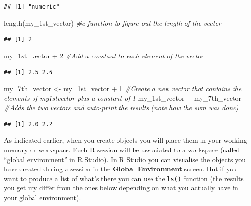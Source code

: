 \documentclass[
]{book}
\newenvironment{Shaded}{\begin{snugshade}}{\end{snugshade}}
\newcommand{\CommentTok}[1]{\textcolor[rgb]{0.56,0.35,0.01}{\textit{#1}}}
\newcommand{\DecValTok}[1]{\textcolor[rgb]{0.00,0.00,0.81}{#1}}
\newcommand{\FunctionTok}[1]{\textcolor[rgb]{0.00,0.00,0.00}{#1}}
\newcommand{\NormalTok}[1]{#1}
\newcommand{\OtherTok}[1]{\textcolor[rgb]{0.56,0.35,0.01}{#1}}
\newcommand{\SpecialCharTok}[1]{\textcolor[rgb]{0.00,0.00,0.00}{#1}}
\begin{document}
\begin{verbatim}
## [1] "numeric"
\end{verbatim}

\begin{Shaded}
\begin{Highlighting}[]
\FunctionTok{length}\NormalTok{(my\_1st\_vector) }\CommentTok{\#a function to figure out the length of the vector}
\end{Highlighting}
\end{Shaded}

\begin{verbatim}
## [1] 2
\end{verbatim}

\begin{Shaded}
\begin{Highlighting}[]
\NormalTok{my\_1st\_vector }\SpecialCharTok{+} \DecValTok{2} \CommentTok{\#Add a constant to each element of the vector}
\end{Highlighting}
\end{Shaded}

\begin{verbatim}
## [1] 2.5 2.6
\end{verbatim}

\begin{Shaded}
\begin{Highlighting}[]
\NormalTok{my\_7th\_vector }\OtherTok{\textless{}{-}}\NormalTok{ my\_1st\_vector }\SpecialCharTok{+} \DecValTok{1} \CommentTok{\#Create a new vector that contains the elements of my1stvector plus a constant of 1}
\NormalTok{my\_1st\_vector }\SpecialCharTok{+}\NormalTok{ my\_7th\_vector }\CommentTok{\#Adds the two vectors and auto{-}print the results (note how the sum was done)}
\end{Highlighting}
\end{Shaded}

\begin{verbatim}
## [1] 2.0 2.2
\end{verbatim}

As indicated earlier, when you create objects you will place them in your working memory or workspace. Each R session will be associated to a workspace (called ``global environment'' in R Studio). In R Studio you can visualise the objects you have created during a session in the \textbf{Global Environment} screen. But if you want to produce a list of what's there you can use the \texttt{ls()} function (the results you get my differ from the ones below depending on what you actually have in your global environment).
\end{document}
